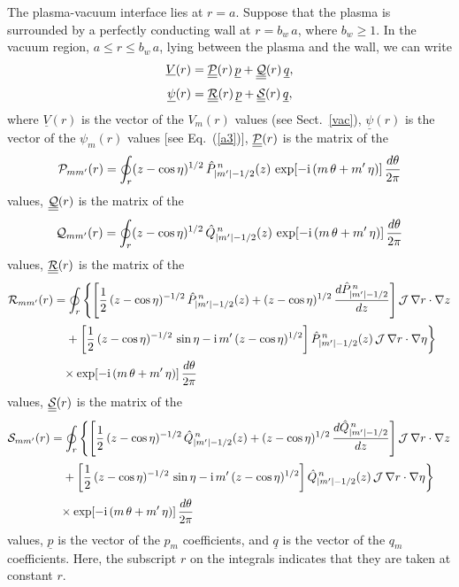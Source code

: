 \documentclass[12pt,prb,aps]{revtex4-1}
\begin{document}
The plasma-vacuum interface lies at $r=a$. Suppose that the plasma is surrounded by a perfectly conducting wall at $r=b_w\,a$, where $b_w\geq 1$.  In the
vacuum region, $a\leq r\leq b_w\,a$,  lying between the plasma and the wall, we can write
\begin{align}\label{e32a}
\underline{V}(r)&= \underline{\underline{{\cal P}}}(r)\,\underline{p}+ \underline{\underline{{\cal Q}}}(r)\,\underline{q},\\[0.5ex]
\underline{\psi}(r)&= \underline{\underline{{\cal R}}}(r)\,\underline{p}+ \underline{\underline{{\cal S}}}(r)\,\underline{q},\label{e33a}
\end{align}
where $\underline{V}(r)$ is the vector of the $V_m(r)$ values (see Sect.~\ref{vac}), $\underline{\psi}(r)$ is the vector of the $\psi_m(r)$ values [see Eq.~(\ref{a3})], $\underline{\underline{{\cal P}}}(r)$ is the
matrix of the
\begin{equation}
{\cal P}_{mm'}(r)=\oint_{r}(z-\cos\eta)^{1/2}\,\hat{P}_{|m'|-1/2}^{\,n}(z)\,\exp[-{\rm i}\,(m\,\theta+m'\,\eta)]\,\frac{d\theta}{2\pi}
\end{equation}
values, 
$\underline{\underline{{\cal Q}}}(r)$ is the
matrix of the
\begin{equation}
{\cal Q}_{mm'}(r)=\oint_{r}(z-\cos\eta)^{1/2}\,\hat{Q}_{|m'|-1/2}^{\,n}(z)\,\exp[-{\rm i}\,(m\,\theta+m'\,\eta)]\,\frac{d\theta}{2\pi}
\end{equation}
values, $\underline{\underline{{\cal R}}}(r)$ is the matrix of the 
\begin{align}\label{e354}
{\cal R}_{mm'}(r) &=\oint_{r}
\left\{\left[\frac{1}{2}\,(z-\cos\eta)^{-1/2}\,\hat{P}_{|m'|-1/2}^{\,n}(z)+(z-\cos\eta)^{1/2}\,\frac{d\hat{P}_{|m'|-1/2}^{\,n}}{dz}\right]{\cal J}\,\nabla r\cdot \nabla z
\right.\nonumber\\[0.5ex]&
\left.\phantom{=}+\left[\frac{1}{2}\,(z-\cos\eta)^{-1/2}\,\sin\eta-{\rm i}\,m'\,(z-\cos\eta)^{1/2}\right]\hat{P}_{|m'|-1/2}^{\,n}(z)\,{\cal J}\,\nabla r\cdot \nabla \eta
\right\}\nonumber\\[0.5ex] &
\phantom{=}\times\exp[-{\rm i}\,(m\,\theta+m'\,\eta)]\,\frac{d\theta}{2\pi}
\end{align}
values, 
$\underline{\underline{{\cal S}}}(r)$ is the matrix of the 
\begin{align}\label{e355}
{\cal S}_{mm'}(r) &=\oint_{r}
\left\{\left[\frac{1}{2}\,(z-\cos\eta)^{-1/2}\,\hat{Q}_{|m'|-1/2}^{\,n}(z)+(z-\cos\eta)^{1/2}\,\frac{d\hat{Q}_{|m'|-1/2}^{\,n}}{dz}\right]{\cal J}\,\nabla r\cdot \nabla z
\right.\nonumber\\[0.5ex]&
\left.\phantom{=}+\left[\frac{1}{2}\,(z-\cos\eta)^{-1/2}\,\sin\eta-{\rm i}\,m'\,(z-\cos\eta)^{1/2}\right]\hat{Q}_{|m'|-1/2}^{\,n}(z)\,{\cal J}\,\nabla r\cdot \nabla \eta
\right\}\nonumber\\[0.5ex] &
\phantom{=}\times\exp[-{\rm i}\,(m\,\theta+m'\,\eta)]\,\frac{d\theta}{2\pi}
\end{align}
values, $\underline{p}$ is the vector of the $p_m$ coefficients, and  $\underline{q}$ is the vector of the $q_m$ coefficients. Here, the
subscript $r$ on the integrals indicates that they are taken at constant $r$. 
\end{document}
